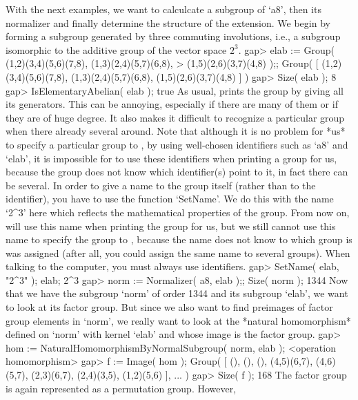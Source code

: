With the next  examples, we want  to calculcate a  subgroup of `a8', then
its  normalizer and finally determine the  structure of the extension. We
begin by forming a subgroup   generated by three commuting   involutions,
i.e., a subgroup  isomorphic to the   additive group of the  vector space
$2^3$.
\beginexample
    gap> elab := Group( (1,2)(3,4)(5,6)(7,8), (1,3)(2,4)(5,7)(6,8),
    >                   (1,5)(2,6)(3,7)(4,8) );;
    Group( [ (1,2)(3,4)(5,6)(7,8), (1,3)(2,4)(5,7)(6,8),
      (1,5)(2,6)(3,7)(4,8) ] )
    gap> Size( elab );
    8
    gap> IsElementaryAbelian( elab );
    true
\endexample
As usual, {\GAP} prints the group by giving  all its generators. This can
be annoying, especially if there are many of them or  if they are of huge
degree. It also makes  it difficult to recognize  a particular group when
there already several  around. Note  that  although it is no  problem for
*us* to    specify a particular  group to   {\GAP}, by  using well-chosen
identifiers such as `a8'  and `elab', it is  impossible for {\GAP} to use
these identifiers when printing  a group for us,  because the group  does
not know which identifier(s) point  to it, in fact  there can be several.
In order to    give a name  to  the  group  itself (rather   than  to the
identifier), you have to use the function `SetName'.  We do this with the
name `2^3' here which reflects  the mathematical properties of the group.
From now on,  {\GAP} will use  this name when  printing the group for us,
but we still cannot use this name to specify the group to {\GAP}, because
the name does  not know to which group   is was assigned (after  all, you
could assign the   same  name to several  groups).  When  talking  to the
computer, you must always use identifiers.
\beginexample
    gap> SetName( elab, "2^3" ); elab;
    2^3
    gap> norm := Normalizer( a8, elab );; Size( norm );
    1344
\endexample
{}%
Now that  we  have the subgroup `norm'   of order 1344   and its subgroup
`elab', we want to look  at its factor  group. But since  we also want to
find preimages of factor group elements in `norm', we really want to look
at the  *natural homomorphism* defined on  `norm' with  kernel `elab' and
whose image is the factor group.
\beginexample
    gap> hom := NaturalHomomorphismByNormalSubgroup( norm, elab );
    <operation homomorphism>
    gap> f := Image( hom );
    Group( [ (), (), (), (4,5)(6,7), (4,6)(5,7), (2,3)(6,7), (2,4)(3,5), 
      (1,2)(5,6) ], ... )
    gap> Size( f );
    168
\endexample
The factor group  is again represented as  a  permutation group. However,
